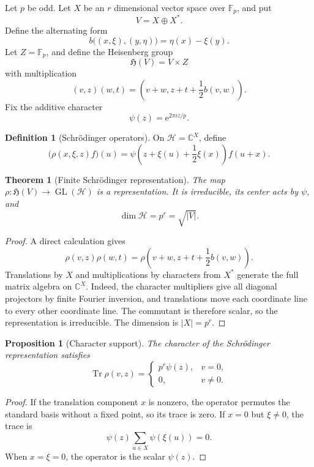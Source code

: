 \documentclass[11pt]{amsart}
\newtheorem{theorem}{Theorem}[section]
\newtheorem{proposition}[proposition]{Proposition}
\theoremstyle{definition}
\newtheorem{definition}[definition]{Definition}
\theoremstyle{remark}
\newcommand{\CC}{\mathbb C}
\newcommand{\FF}{\mathbb F}
\newcommand{\GL}{\operatorname{GL}}
\newcommand{\Tr}{\operatorname{Tr}}
\newcommand{\e}{\mathrm e}
\newcommand{\abs}[1]{\left\lvert#1\right\rvert}
\newcommand{\calH}{\mathcal H}
\newcommand{\frakH}{\mathfrak H}
\begin{document}
Let \(p\) be odd. Let \(X\) be an \(r\) dimensional vector space over \(\FF_p\), and put
\[
V=X\oplus X^*.
\]
Define the alternating form
\[
b\bigl((x,\xi),(y,\eta)\bigr)
=
\eta(x)-\xi(y).
\]
Let \(Z=\FF_p\), and define the Heisenberg group
\[
\frakH(V)=V\times Z
\]
with multiplication
\[
(v,z)(w,t)
=
\left(v+w,z+t+\frac12 b(v,w)\right).
\]
Fix the additive character
\[
\psi(z)=\e^{2\pi iz/p}.
\]

\begin{definition}[Schrödinger operators]\label{def:schrodinger}
On \(\calH=\CC^X\), define
\[
\bigl(\rho(x,\xi,z)f\bigr)(u)
=
\psi\left(z+\xi(u)+\frac12\xi(x)\right)f(u+x).
\]
\end{definition}

\begin{theorem}[Finite Schrödinger representation]\label{thm:schrodinger_rep}
The map \(\rho:\frakH(V)\to\GL(\calH)\) is a representation. It is irreducible, its center acts by \(\psi\), and
\[
\dim\calH=p^r=\sqrt{\abs V}.
\]
\end{theorem}

\begin{proof}
A direct calculation gives
\[
\rho(v,z)\rho(w,t)
=
\rho\left(v+w,z+t+\frac12b(v,w)\right).
\]
Translations by \(X\) and multiplications by characters from \(X^*\) generate the full matrix algebra on \(\CC^X\). Indeed, the character multipliers give all diagonal projectors by finite Fourier inversion, and translations move each coordinate line to every other coordinate line. The commutant is therefore scalar, so the representation is irreducible. The dimension is \(\abs X=p^r\).
\end{proof}

\begin{proposition}[Character support]\label{prop:heisenberg_trace}
The character of the Schrödinger representation satisfies
\[
\boxed{
\Tr\rho(v,z)
=
\begin{cases}
p^r\psi(z),&v=0,\\
0,&v\ne0.
\end{cases}
}
\]
\end{proposition}

\begin{proof}
If the translation component \(x\) is nonzero, the operator permutes the standard basis without a fixed point, so its trace is zero. If \(x=0\) but \(\xi\ne0\), the trace is
\[
\psi(z)\sum_{u\in X}\psi(\xi(u))=0.
\]
When \(x=\xi=0\), the operator is the scalar \(\psi(z)\).
\end{proof}
\end{document}
